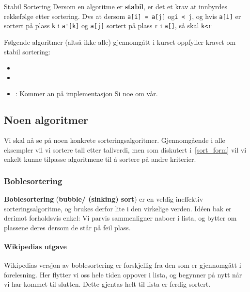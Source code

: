 \begin{definisjon} Stabil Sortering
  Dersom en algoritme er \textbf{stabil}, er det et krav at innbyrdes rekkefølge
  etter sortering. Dvs at dersom \verb|a[i] = a[j]| og\verb|i < j|, og hvis
  \verb|a[i]| er sortert på plass \verb|k| i \verb|a'[k]| og \verb|a[j]| sortert
  på plass \verb|r| i \verb|a[]|, så skal \verb|k<r| 
\end{definisjon}

Følgende algoritmer (altså ikke alle) gjennomgått i kurset oppfyller kravet om
stabil sortering:
\begin{itemize}
\item {} 
\item {} 
\item {}: Kommer an på implementasjon \color{red}Si noe om vår.
\end{itemize}

\subsection{\color{red}Noen algoritmer}
Vi skal nå se på noen konkrete sorteringsalgoritmer. Gjennomgående i alle
eksempler vil vi sortere tall etter tallverdi, men som diskutert i~\ref{sort_form} vil vi enkelt kunne tilpasse algoritmene til å sortere på andre kriterier. 


\subsubsection{\color{red}Boblesortering}
\label{bubblesort}
\textbf{Boblesortering} (\textbf{bubble/ (sinking) sort})  er en veldig ineffektiv sorteringsalgoritme, og brukes derfor lite i den virkelige verden. 
Idéen bak er derimot forholdsvis enkel:
Vi parvis sammenligner naboer i lista, og bytter om plassene deres dersom de står på feil plass.

\paragraph*{Wikipedias utgave}\label{sec:bubble-wiki}
Wikipedias versjon av boblesortering er forskjellig fra den som er gjennomgått i forelesning.
Her flytter vi oss hele tiden oppover i lista, og begynner på nytt når vi har kommet til slutten.
Dette gjentas helt til lista er ferdig sortert.

